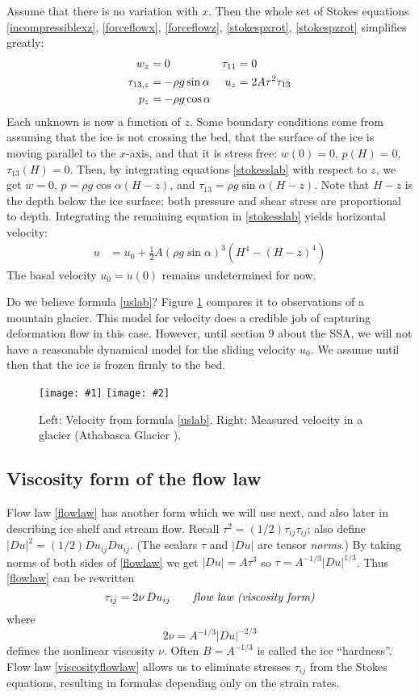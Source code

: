\documentclass[letterpaper,final,12pt,reqno]{amsart}
\newcommand{\twofigsizes}[5]{
\begin{figure}[ht]
\centering
\texttt{[image: \#1]} \quad
\texttt{[image: \#2]}
\caption{#3}
\label{fig:#1}
\end{figure}}
\begin{document}
Assume that there is no variation with $x$. Then the whole set of Stokes equations \eqref{incompressiblexz}, \eqref{forceflowx}, \eqref{forceflowz}, \eqref{stokespxrot}, \eqref{stokespzrot} simplifies greatly:
\begin{align}
w_z &= 0 &   \tau_{11} &= 0 \label{stokesslab} \\
\tau_{13,z} &= - \rho g \sin\alpha &   u_z &= 2 A \tau^2 \tau_{13} \notag \\
p_z &= - \rho g \cos\alpha \notag
\end{align}
Each unknown is now a function of $z$.  Some boundary conditions come from assuming that the ice is not crossing the bed, that the surface of the ice is moving parallel to the $x$-axis, and that it is stress free: $w(0)=0$, $p(H)=0$, $\tau_{13}(H)=0$.  Then, by integrating equations \eqref{stokesslab} with respect to $z$, we get $w=0$, $p = \rho g \cos\alpha (H-z)$, and $\tau_{13} = \rho g \sin\alpha (H-z)$.  Note that $H-z$ is the depth below the ice surface; both pressure and shear stress are proportional to depth.  Integrating the remaining equation in \eqref{stokesslab} yields horizontal velocity:
\begin{align}
u &= u_0 + \frac{1}{2} A (\rho g \sin\alpha)^3  \left(H^4 - (H-z)^4\right)  \label{uslab}
\end{align}
The basal velocity $u_0=u(0)$ remains undetermined for now.

Do we believe formula \eqref{uslab}?  Figure \ref{fig:slabvel} compares it to observations of a mountain glacier.  This model for velocity does a credible job of capturing deformation flow in this case.  However, until section 9 about the SSA, we will not have a reasonable dynamical model for the sliding velocity $u_0$.  We assume until then that the ice is frozen firmly to the bed.

\twofigsizes{slabvel}{athabasca-deform}{Left:  Velocity from formula \eqref{uslab}.  Right:  Measured velocity in a glacier (Athabasca Glacier \cite{SavagePaterson}).}{2.0in}{1.8in}

\subsection*{Viscosity form of the flow law}  Flow law \eqref{flowlaw} has another form which we will use next, and also later in describing ice shelf and stream flow.  Recall $\tau^2 = (1/2) \tau_{ij} \tau_{ij}$; also define $|Du|^2 = (1/2) Du_{ij} Du_{ij}$.  (The scalars $\tau$ and $|Du|$ are tensor \emph{norms}.)  By taking norms of both sides of \eqref{flowlaw} we get $|Du| = A \tau^3$ so $\tau = A^{-1/3} |Du|^{1/3}$.  Thus \eqref{flowlaw} can be rewritten
\begin{equation}
\tau_{ij} = 2 \nu\, Du_{ij}  \qquad \text{\emph{flow law (viscosity form)}} \label{viscosityflowlaw}
\end{equation}
where
    $$2\nu = A^{-1/3} |Du|^{-2/3}$$
defines the nonlinear viscosity $\nu$.  Often $B = A^{-1/3}$ is called the ice ``hardness''.  Flow law \eqref{viscosityflowlaw} allows us to eliminate stresses $\tau_{ij}$ from the Stokes equations, resulting in formulas depending only on the strain rates.
\end{document}
